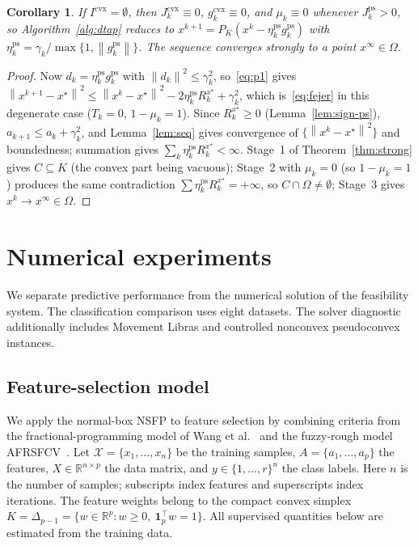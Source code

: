 \documentclass[]{interact}
\theoremstyle{plain}
\newtheorem{corollary}[theorem]{Corollary}
\theoremstyle{definition}
\theoremstyle{remark}
\newcommand{\R}{\mathbb{R}}
\newcommand{\norm}[1]{\left\lVert #1 \right\rVert}
\newcommand{\cvx}{\mathrm{cvx}}
\newcommand{\ps}{\mathrm{ps}}
\begin{document}
\begin{corollary}\label{cor:ps}
If $I^{\cvx}=\emptyset$, then $J^{\cvx}_k\equiv0$, $g^{\cvx}_k\equiv0$, and $\mu_k\equiv0$
whenever $J^{\ps}_k>0$, so Algorithm~\ref{alg:dtap} reduces to
$x^{k+1}=P_K(x^k-\eta^{\ps}_k g^{\ps}_k)$ with $\eta^{\ps}_k=\gamma_k/\max\{1,\norm{g^{\ps}_k}\}$.
The sequence converges strongly to a point $x^\infty\in\Omega$.
\end{corollary}
\begin{proof}
Now $d_k=\eta^{\ps}_k g^{\ps}_k$ with $\norm{d_k}^2\le\gamma_k^2$, so~\eqref{eq:p1} gives
$\norm{x^{k+1}-x^\star}^2\le\norm{x^k-x^\star}^2-2\eta^{\ps}_k R^{x^\star}_k+\gamma_k^2$,
which is~\eqref{eq:fejer} in this degenerate case ($T_k=0$, $1-\mu_k=1$). Since
$R^{x^\star}_k\ge0$ (Lemma~\ref{lem:sign-ps}), $a_{k+1}\le a_k+\gamma_k^2$, and
Lemma~\ref{lem:seq} gives convergence of $\{\norm{x^k-x^\star}^2\}$ and boundedness;
summation gives $\sum_k\eta^{\ps}_k R^{x^\star}_k<\infty$. Stage~1 of
Theorem~\ref{thm:strong} gives $C\subseteq K$ (the convex part being vacuous); Stage~2 with
$\mu_k=0$ (so $1-\mu_k=1$) produces the same contradiction $\sum\eta^{\ps}_k R^{x^\star}_k=+\infty$,
so $C\cap\Omega\ne\emptyset$; Stage~3 gives $x^k\to x^\infty\in\Omega$.
\end{proof}


\section{Numerical experiments}\label{sec:experiments}
We separate predictive performance from the numerical solution of the feasibility system. The classification comparison uses eight datasets. The solver diagnostic additionally includes Movement Libras and controlled nonconvex pseudoconvex instances.

\subsection{Feature-selection model}\label{sec:fs}
We apply the normal-box NSFP to feature selection by combining criteria from the fractional-programming model of Wang et al.~\citep{wang2021fractional} and the fuzzy-rough model AFRSFCV~\citep{wang2026afrsfcv}. Let $\mathcal{X}=\{x_1,\ldots,x_n\}$ be the training samples, $A=\{a_1,\ldots,a_p\}$ the features, $X\in\R^{n\times p}$ the data matrix, and $y\in\{1,\ldots,r\}^n$ the class labels. Here $n$ is the number of samples; subscripts index features and superscripts index iterations. The feature weights belong to the compact convex simplex $K=\Delta_{p-1}=\{w\in\R^p:w\ge0,\ \mathbf1_p^{\top}w=1\}$. All supervised quantities below are estimated from the training data.
\end{document}
